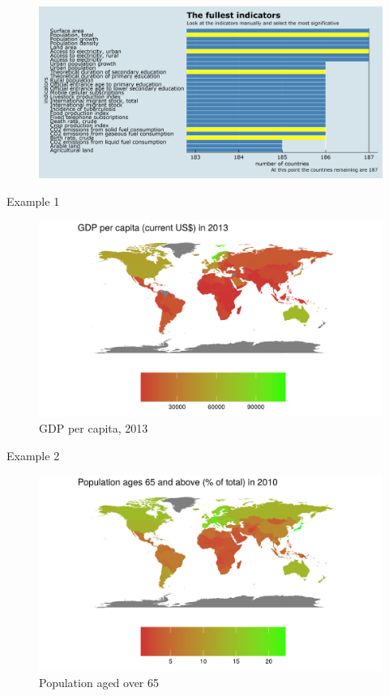 \documentclass[10pt]{beamer}
\begin{document}
\begin{frame}
	\begin{figure}
		\centering
		\includegraphics[width=\textwidth]{plot0007.png}
	\end{figure}
\end{frame}


\begin{frame}{Example 1}
	\begin{figure}
		\centering
		\includegraphics[width=\textwidth]{GDP.png}
		\caption[GDP per capita, 2013]{GDP per capita, 2013}
	\end{figure}
		
\end{frame}
\begin{frame}{Example 2}
	\begin{figure}
		\centering
		\includegraphics[width=1\textwidth]{ageing.png}
		\caption[Population aged over 65]{Population aged over 65}
	\end{figure}
\end{frame}
\end{document}
